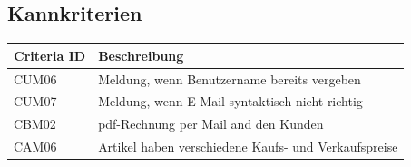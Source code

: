 \documentclass[a4paper]{article}
\begin{document}

\subsection{Kannkriterien}

\begin{longtable}{|p{100px}|p{250px}|}
	\hline
	\rowcolor[HTML]{C0C0C0}
	Criteria ID & Beschreibung \\ \hline
	CUM06 & Meldung, wenn Benutzername bereits vergeben  \\ \hline
	CUM07 & Meldung, wenn E-Mail syntaktisch nicht richtig  \\ \hline
	CBM02 & pdf-Rechnung per Mail and den Kunden  \\ \hline
	CAM06 & Artikel haben verschiedene Kaufs- und Verkaufspreise  \\ \hline
\end{longtable}
\end{document}
